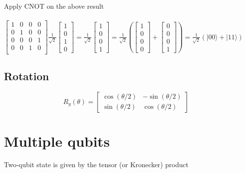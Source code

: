 \documentclass[11pt, fleqn]{article}
\begin{document}
\begin{Large}
Apply CNOT on the above result\\~\\
$\begin{bmatrix}1&0&0&0\\0&1&0&0\\0&0&0&1\\0&0&1&0\\\end{bmatrix} \frac{1}{\sqrt 2}\begin{bmatrix}1\\0\\1\\0 \end{bmatrix} =
\frac{1}{\sqrt 2}\begin{bmatrix}1\\0\\0\\1 \end{bmatrix}=
\frac{1}{\sqrt 2}\left(\begin{bmatrix}1\\0\\0\\0 \end{bmatrix}+
\begin{bmatrix}0\\0\\0\\1 \end{bmatrix}\right)=
\frac{1}{\sqrt 2}\left(|00\rangle+|11\rangle\right)$

\end{Large}

\vspace{1em}
\subsection{Rotation}
\[R_y(\theta) =\begin{bmatrix}\cos(\theta/2) & -\sin(\theta/2)\\ \sin(\theta/2) & \cos(\theta/2)\end{bmatrix}\]

\newpage
\section{Multiple qubits}

Two-qubit state is given by the tensor (or Kronecker) product
\end{document}
